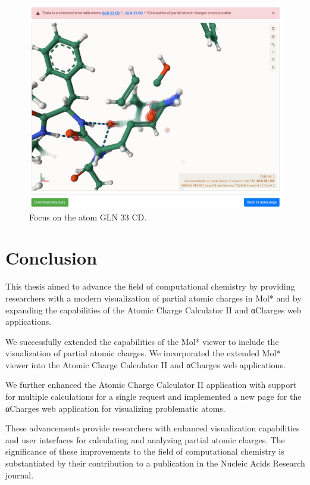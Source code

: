 \documentclass[
  digital,     %
  oneside,     %
  nosansbold,  %
  nocolorbold, %
  lof,         %
  lot,         %
]{fithesis4}
\begin{document}
\begin{figure}[htbp]
  \begin{center}
    \includegraphics[width=\textwidth]{figures/wrong_structure_focus.png}
  \end{center}
  \caption{Focus on the atom GLN 33 CD.}
  \label{fig:wrong_structure_focus}
\end{figure}

\newpage

\chapter*{Conclusion}

This thesis aimed to advance the field of computational chemistry by providing researchers with a modern visualization of partial atomic charges in Mol* and by expanding the capabilities of the Atomic Charge Calculator II and αCharges web applications.

We successfully extended the capabilities of the Mol* viewer to include the visualization of partial atomic charges. We incorporated the extended Mol* viewer into the Atomic Charge Calculator II and αCharges web applications.

We further enhanced the Atomic Charge Calculator II application with support for multiple calculations for a single request and implemented a new page for the αCharges web application for visualizing problematic atoms.

These advancements provide researchers with enhanced visualization capabilities and user interfaces for calculating and analyzing partial atomic charges. The significance of these improvements to the field of computational chemistry is substantiated by their contribution to a publication in the Nucleic Acids Research journal.
\end{document}

